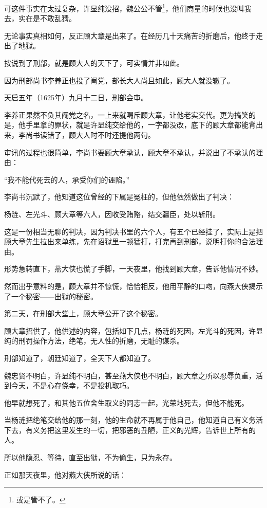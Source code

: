 \begin{multicols}{\theparacolNo}
		可这件事实在太过复杂，许显纯没招，魏公公不管\footnote{或是管不了。}，他们商量的时候也没叫我去，实在是不敢乱猜。

		无论事实真相如何，反正顾大章是出来了。在经历几十天痛苦的折磨后，他终于走出了地狱。

		按说到了刑部，就是顾大人的天下了，可实情并非如此。

		因为刑部尚书李养正也投了阉党，部长大人尚且如此，顾大人就没辙了。

		天启五年（1625年）九月十二日，刑部会审。

		李养正果然不负其阉党之名，一上来就喝斥顾大章，让他老实交代。更为搞笑的是，他手里拿的罪状，就是许显纯交给他的，一字都没改，底下的顾大章都能背出来，李尚书读错了，顾大人时不时还提他两句。

		审讯的过程也很简单，李尚书要顾大章承认，顾大章不承认，并说出了不承认的理由：

		“我不能代死去的人，承受你们的诬陷。”

		李尚书沉默了，他知道这位曾经的下属是冤枉的，但他依然做出了判决：

		杨涟、左光斗、顾大章等六人，因收受贿赂，结交疆臣，处以斩刑。

		这是一份相当无聊的判决，因为判决书里的六个人，有五个已经挂了，实际上是把顾大章先生拉出来单练，先在诏狱里一顿猛打，打完再到刑部，说明打你的合法理由。

		形势急转直下，燕大侠也慌了手脚，一天夜里，他找到顾大章，告诉他情况不妙。

		然而出乎意料的是，顾大章并不惊慌，恰恰相反，他用平静的口吻，向燕大侠揭示了一个秘密——出狱的秘密。

		第二天，在刑部大堂上，顾大章公开了这个秘密。

		顾大章招供了，他供述的内容，包括如下几点，杨涟的死因，左光斗的死因，许显纯的刑罚操作方法，绝笔，无人性的折磨，无耻的谋杀。

		刑部知道了，朝廷知道了，全天下人都知道了。

		魏忠贤不明白，许显纯不明白，甚至燕大侠也不明白，顾大章之所以忍辱负重，活到今天，不是心存侥幸，不是投机取巧。

		他早就想死了，和其他五位舍生取义的同志一起，光荣地死去，但他不能死。

		当杨涟把绝笔交给他的那一刻，他的生命就不再属于他自己，他知道自己有义务活下去，有义务把这里发生的一切，把邪恶的丑陋，正义的光辉，告诉世上所有的人。

		所以他隐忍、等待，直至出狱，不为偷生，只为永存。

		正如那天夜里，他对燕大侠所说的话：


\end{multicols}

